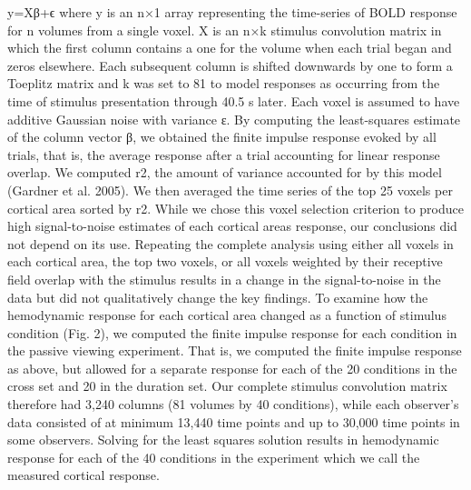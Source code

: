\documentclass{report}
\begin{document}
y=Xβ+ϵ
where y is an n×1 array representing the time-series of BOLD response for n volumes from a single voxel. X is an n×k stimulus convolution matrix in which the first column contains a one for the volume when each trial began and zeros elsewhere. Each subsequent column is shifted downwards by one to form a Toeplitz matrix and k was set to 81 to model responses as occurring from the time of stimulus presentation through 40.5 s later. Each voxel is assumed to have additive Gaussian noise with variance ε. By computing the least-squares estimate of the column vector β, we obtained the finite impulse response evoked by all trials, that is, the average response after a trial accounting for linear response overlap. We computed r2, the amount of variance accounted for by this model (Gardner et al. 2005). We then averaged the time series of the top 25 voxels per cortical area sorted by r2. While we chose this voxel selection criterion to produce high signal-to-noise estimates of each cortical areas response, our conclusions did not depend on its use. Repeating the complete analysis using either all voxels in each cortical area, the top two voxels, or all voxels weighted by their receptive field overlap with the stimulus results in a change in the signal-to-noise in the data but did not qualitatively change the key findings.
To examine how the hemodynamic response for each cortical area changed as a function of stimulus condition (Fig. 2), we computed the finite impulse response for each condition in the passive viewing experiment. That is, we computed the finite impulse response as above, but allowed for a separate response for each of the 20 conditions in the cross set and 20 in the duration set. Our complete stimulus convolution matrix therefore had 3,240 columns (81 volumes by 40 conditions), while each observer’s data consisted of at minimum 13,440 time points and up to 30,000 time points in some observers. Solving for the least squares solution results in hemodynamic response for each of the 40 conditions in the experiment which we call the measured cortical response.
\end{document}
